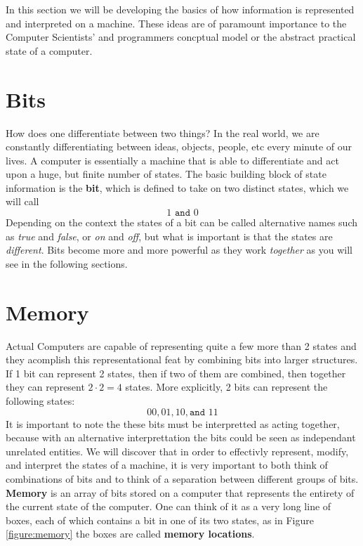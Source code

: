 \documentclass[12pt, letterpaper]{book}
\begin{document}
In this section we will be developing the basics of how information is represented and interpreted on a machine. These ideas are of paramount importance to the Computer Scientists' and programmers concptual model or the abstract practical state of a computer.

	\section{Bits}

	How does one differentiate between two things? In the real world, we are constantly differentiating between ideas, objects, people, etc every minute of our lives. A computer is essentially a machine that is able to differentiate and act upon a huge, but finite number of states. The basic building block of state information is the \textbf{bit}, which is defined to take on two distinct states, which we will call $$1 \texttt{ and } 0$$
 Depending on the context the states of a bit can be called alternative names such as \textit{true} and \textit{false}, or \textit{on} and \textit{off}, but what is important is that the states are \textit{different}. Bits become more and more powerful as they work \textit{together} as you will see in the following sections.

	\section{Memory}

	Actual Computers are capable of representing quite a few more than 2 states and they acomplish this representational feat by combining bits into larger structures. If 1 bit can represent 2 states, then if two of them are combined, then together they can represent $2 \cdot 2 = 4$ states. More explicitly, 2 bits can represent the following states: $$00, 01, 10, \texttt{and }11$$ It is important to note the these bits must be interpretted as acting together, because with an alternative interprettation the bits could be seen as independant unrelated entities. We will discover that in order to effectivly represent, modify, and interpret the states of a machine, it is very important to both think of combinations of bits and to think of a separation between different groups of bits.
	\textbf{Memory} is an array of bits stored on a computer that represents the entirety of the current state of the computer. One can think of it as a very long line of boxes, each of which contains a bit in one of its two states, as in Figure \ref{figure:memory} the boxes are called \textbf{memory locations}.
\end{document}
